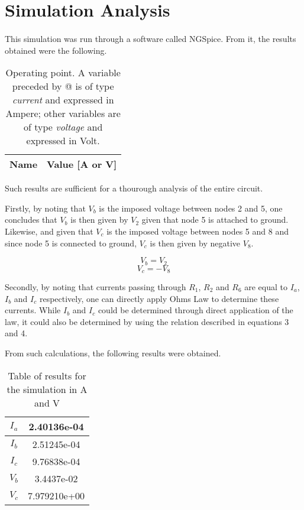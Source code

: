 \section{Simulation Analysis}
\label{sec:simulation}
\paragraph{}

\par This simulation was run through a software called NGSpice. From it, the results obtained were the following. 
\begin{table}[H]
  \centering
  \begin{tabular}{|c|c|}
    \hline    
    {\bf Name} & {\bf Value [A or V]} \\ \hline
    
  \end{tabular}
  \caption{Operating point. A variable preceded by @ is of type {\em current}
    and expressed in Ampere; other variables are of type {\it voltage} and expressed in
    Volt.}
  \label{tab:op}
\end{table}

\par Such results are sufficient for a thourough analysis of the entire circuit. 
\par Firstly, by noting that $V_b$ is the imposed voltage between nodes 2 and 5, one concludes that $V_b$ is then given by $V_2$ given that node 5 is attached to ground. Likewise, and given that $V_c$ is the imposed voltage between nodes 5 and 8 and since node 5 is connected to ground, $V_c$ is then given by negative $V_8$.

\begin{equation}
	V_b=V_{2}
\end{equation}
\begin{equation}
	V_c=-V_{8}
\end{equation}

\par Secondly, by noting that currents passing through $R_1$, $R_2$ and $R_6$ are equal to $I_a$, $I_b$ and $I_c$ respectively, one can directly apply Ohms Law to determine these currents. While $I_b$ and $I_c$ could be determined through direct application of the law, it could also be determined by using the relation described in equations 3 and 4. 
\par From such calculations, the following results were obtained. 
\begin{table}[H]
    \centering
    \begin{tabular}{|c|c|}
    \hline
        $I_a$ & 2.40136e-04\\ \hline
        $I_b$ & 2.51245e-04\\ \hline
        $I_c$ & 9.76838e-04\\ \hline
        $V_b$ & 3.4437e-02\\ \hline
        $V_c$ & 7.979210e+00\\ \hline
    \end{tabular}
    \caption{Table of results for the simulation in A and V}
\end{table}



